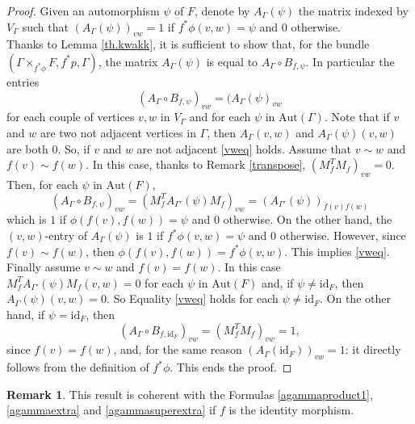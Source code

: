 \documentclass{amsart}
\theoremstyle{definition}
\newtheorem{rem}[theo]{Remark}
\numberwithin{equation}{section}
\begin{document}
\begin{proof}
Given an automorphism $\psi$ of $F$, denote by $A_\Gamma(\psi)$ the matrix indexed by $V_\Gamma$ such that $(A_\Gamma(\psi))_{vw}=1$ if $f^*\phi(v,w)= \psi$ and $0$ otherwise.
\\Thanks to Lemma \ref{th.kwakk}, it is sufficient to show that, for the bundle $(\Gamma \times_{f^*\phi} F, f^*p, \Gamma)$, the matrix $A_\Gamma(\psi)$ is equal to $A_{\Gamma} \circ B_{f,\psi}$. In particular the entries 
\begin{equation}\label{vweq}
 (A_{\Gamma}\circ B_{f,\psi})_{vw} = (A_\Gamma(\psi)_{vw}
\end{equation}
for each couple of vertices $v,w$ in $V_\Gamma$ and for each $\psi$ in $\mathrm{Aut}(\Gamma)$. Note that if $v$ and $w$ are two not adjacent vertices in $\Gamma$, then $A_{\Gamma}(v,w)$ and $A_\Gamma(\psi)(v,w)$ are both $0$. So, if $v$ and $w$ are not adjacent  \eqref{vweq} holds. Assume that $v\sim w$ and $f(v) \sim f(w)$. In this case, thanks to Remark \ref{transpose}, $(M_f^TM_{f})_{vw} = 0$. Then, for each $\psi$ in $\mathrm{Aut}(F)$,
\begin{equation}
(A_{\Gamma}\circ B_{f,\psi})_{vw} = (M_f^TA_{\Gamma'}(\psi)M_f)_{vw} = (A_{\Gamma'}(\psi))_{f(v)f(w)}
\end{equation}
which is $1$ if $\phi(f(v), f(w)) = \psi$ and $0$ otherwise. On the other hand, the $(v,w)$-entry of $A_\Gamma(\psi)$ is $1$ if $f^*\phi(v, w) =\psi$ and $0$ otherwise. However, since $f(v) \sim f(w)$, then $\phi(f(v), f(w)) = f^*\phi(v,w)$. This implies  \eqref{vweq}. Finally assume $v \sim w$ and $f(v) = f(w)$. In this case $M_f^TA_{\Gamma'}(\psi)M_f(v,w) = 0$ for each $\psi$ in $\mathrm{Aut}(F)$ and, if $\psi \neq \mathrm{id}_F$, then $A_\Gamma(\psi)(v,w) = 0$. So Equality \ref{vweq} holds for each $\psi \neq \mathrm{id}_F$. On the other hand, if $\psi = \mathrm{id}_F$, then
\begin{equation}
(A_{\Gamma}\circ B_{f,\mathrm{id}_F})_{vw} = (M_f^TM_f)_{vw} = 1,
\end{equation}
since $f(v)= f(w)$, and, for the same reason $(A_{\Gamma}(\mathrm{id}_F))_{vw} = 1$: it directly follows from the definition of $f^*\phi$. This ends the proof.
\end{proof}
\begin{rem}
This result is coherent with the Formulas \eqref{agammaproduct1}, \eqref{agammaextra} and \eqref{agammasuperextra} if $f$ is the identity morphism.
\end{rem}
\end{document}
